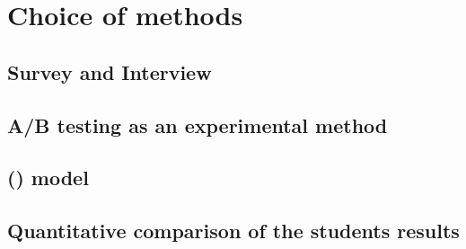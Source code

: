 \chapter{Choice of methods}
\label{chapter4:choice_of_methods}

\section{Survey and Interview}
\label{chapter4:survey_and_interview}


\section{A/B testing as an experimental method}
\label{chapter4:ab_testing_experimental}


\section{ () model}
\label{chapter4:qa_model}

\section{Quantitative comparison of the students results}
\label{chapter4:quantitative_comparison}

